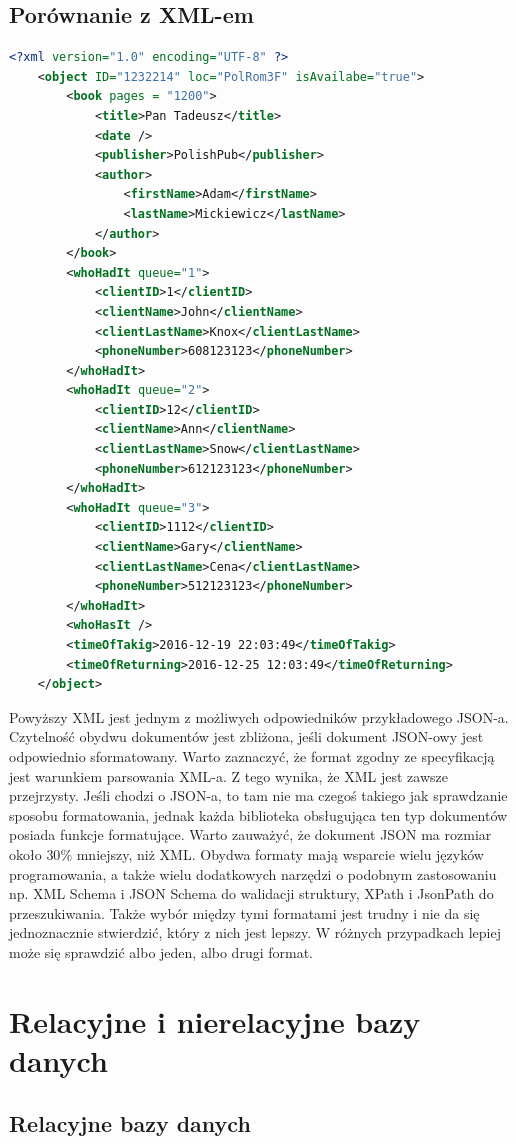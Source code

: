 \documentclass[a4paper,12pt,table]{article}
\begin{document}
\subsection{Porównanie z XML-em}
\begin{lstlisting}[language=xml]
<?xml version="1.0" encoding="UTF-8" ?>
	<object ID="1232214" loc="PolRom3F" isAvailabe="true">
		<book pages = "1200">
			<title>Pan Tadeusz</title>
			<date />
			<publisher>PolishPub</publisher>
			<author>
				<firstName>Adam</firstName>
				<lastName>Mickiewicz</lastName>
			</author>
		</book>
		<whoHadIt queue="1">
			<clientID>1</clientID>
			<clientName>John</clientName>
			<clientLastName>Knox</clientLastName>
			<phoneNumber>608123123</phoneNumber>
		</whoHadIt>
		<whoHadIt queue="2">
			<clientID>12</clientID>
			<clientName>Ann</clientName>
			<clientLastName>Snow</clientLastName>
			<phoneNumber>612123123</phoneNumber>
		</whoHadIt>
		<whoHadIt queue="3">
			<clientID>1112</clientID>
			<clientName>Gary</clientName>
			<clientLastName>Cena</clientLastName>
			<phoneNumber>512123123</phoneNumber>
		</whoHadIt>
		<whoHasIt />
		<timeOfTakig>2016-12-19 22:03:49</timeOfTakig>
		<timeOfReturning>2016-12-25 12:03:49</timeOfReturning>	
	</object>
\end{lstlisting}
\vspace{0.5cm}
Powyższy XML jest jednym z możliwych odpowiedników przykładowego JSON-a. Czytelność obydwu dokumentów jest zbliżona, jeśli dokument JSON-owy jest odpowiednio sformatowany. Warto zaznaczyć, że format zgodny ze specyfikacją jest warunkiem parsowania XML-a. Z tego wynika, że XML jest zawsze przejrzysty. Jeśli chodzi o JSON-a, to tam nie ma czegoś takiego jak sprawdzanie sposobu formatowania, jednak każda biblioteka obsługująca ten typ dokumentów posiada funkcje formatujące. Warto zauważyć, że dokument JSON ma rozmiar około $30\%$ mniejszy, niż XML. Obydwa formaty mają wsparcie wielu języków programowania, a także wielu dodatkowych narzędzi o podobnym zastosowaniu np. XML Schema i JSON Schema do walidacji struktury, XPath i JsonPath do przeszukiwania. Także wybór między tymi formatami jest trudny i nie da się jednoznacznie stwierdzić, który z nich jest lepszy. W różnych przypadkach lepiej może się sprawdzić albo jeden, albo drugi format.
\newpage
\section{Relacyjne i nierelacyjne bazy danych}
\subsection{Relacyjne bazy danych}
\end{document}
